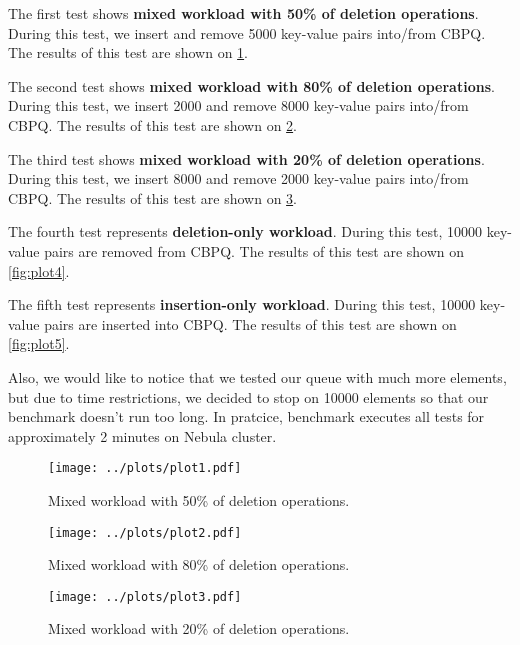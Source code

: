 \documentclass{article}
\begin{document}
The first test shows\textbf{ mixed workload with 50\% of deletion operations}. During this test, we insert and remove 5000 key-value pairs into/from CBPQ. The results of this test are shown on \cref{fig:plot1}.\par

The second test shows \textbf{mixed workload with 80\% of deletion operations}. During this test, we insert 2000 and remove 8000 key-value pairs into/from CBPQ. The results of this test are shown on \cref{fig:plot2}.\par

The third test shows \textbf{mixed workload with 20\% of deletion operations}. During this test, we insert 8000 and remove 2000 key-value pairs into/from CBPQ. The results of this test are shown on \cref{fig:plot3}.\par

The fourth test represents \textbf{deletion-only workload}. During this test, 10000 key-value pairs are removed from CBPQ. The results of this test are shown on \cref{fig:plot4}.\par

The fifth test represents \textbf{insertion-only workload}. During this test, 10000 key-value pairs are inserted into CBPQ. The results of this test are shown on \cref{fig:plot5}.\par

Also, we would like to notice that we tested our queue with much more elements, but due to time restrictions, we decided to stop on 10000 elements so that our benchmark doesn't run too long. In pratcice, benchmark executes all tests for approximately 2 minutes on Nebula cluster.

\begin{figure}[H]
  \centering
  \texttt{[image: ../plots/plot1.pdf]}
  \caption{Mixed workload with 50\% of deletion operations.}
  \label{fig:plot1}
\end{figure}

\begin{figure}[H]
  \centering
  \texttt{[image: ../plots/plot2.pdf]}
  \caption{Mixed workload with 80\% of deletion operations.}
  \label{fig:plot2}
\end{figure}

\begin{figure}[H]
  \centering
  \texttt{[image: ../plots/plot3.pdf]}
  \caption{Mixed workload with 20\% of deletion operations.}
  \label{fig:plot3}
\end{figure}
\end{document}
